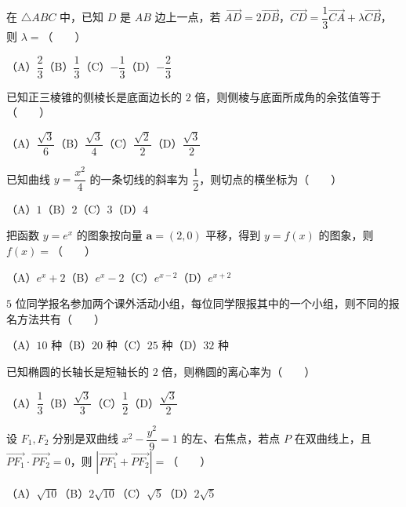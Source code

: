 \begin{question}
在 $\triangle ABC$ 中，已知 $D$ 是 $AB$ 边上一点，若 $\overrightarrow{AD}=2\overrightarrow{DB}$，$\overrightarrow{CD}=\dfrac13\overrightarrow{CA}+\lambda\overrightarrow{CB}$，则 $\lambda=$\mbox{（　　）}

（A）$\dfrac23$\quad（B）$\dfrac13$\quad（C）$-\dfrac13$\quad（D）$-\dfrac23$

\end{question}
\begin{question}
已知正三棱锥的侧棱长是底面边长的 $2$ 倍，则侧棱与底面所成角的余弦值等于\mbox{（　　）}

（A）$\dfrac{\sqrt3}{6}$\quad（B）$\dfrac{\sqrt3}{4}$\quad（C）$\dfrac{\sqrt2}{2}$\quad（D）$\dfrac{\sqrt3}{2}$

\end{question}
\begin{question}
已知曲线 $y=\dfrac{x^2}{4}$ 的一条切线的斜率为 $\dfrac12$，则切点的横坐标为\mbox{（　　）}

（A）$1$\quad（B）$2$\quad（C）$3$\quad（D）$4$

\end{question}
\begin{question}
把函数 $y=e^x$ 的图象按向量 $\boldsymbol a=(2,0)$ 平移，得到 $y=f(x)$ 的图象，则 $f(x)=$\mbox{（　　）}

（A）$e^x+2$\quad（B）$e^x-2$\quad（C）$e^{x-2}$\quad（D）$e^{x+2}$

\end{question}
\begin{question}
$5$ 位同学报名参加两个课外活动小组，每位同学限报其中的一个小组，则不同的报名方法共有\mbox{（　　）}

（A）$10$ 种\quad（B）$20$ 种\quad（C）$25$ 种\quad（D）$32$ 种

\end{question}
\begin{question}
已知椭圆的长轴长是短轴长的 $2$ 倍，则椭圆的离心率为\mbox{（　　）}

（A）$\dfrac13$\quad（B）$\dfrac{\sqrt3}{3}$\quad（C）$\dfrac12$\quad（D）$\dfrac{\sqrt3}{2}$

\end{question}
\begin{question}
设 $F_1,F_2$ 分别是双曲线 $x^2-\dfrac{y^2}{9}=1$ 的左、右焦点，若点 $P$ 在双曲线上，且 $\overrightarrow{PF_1}\cdot\overrightarrow{PF_2}=0$，则 $|\overrightarrow{PF_1}+\overrightarrow{PF_2}|=$\mbox{（　　）}

（A）$\sqrt{10}$\quad（B）$2\sqrt{10}$\quad（C）$\sqrt5$\quad（D）$2\sqrt5$

\end{question}

